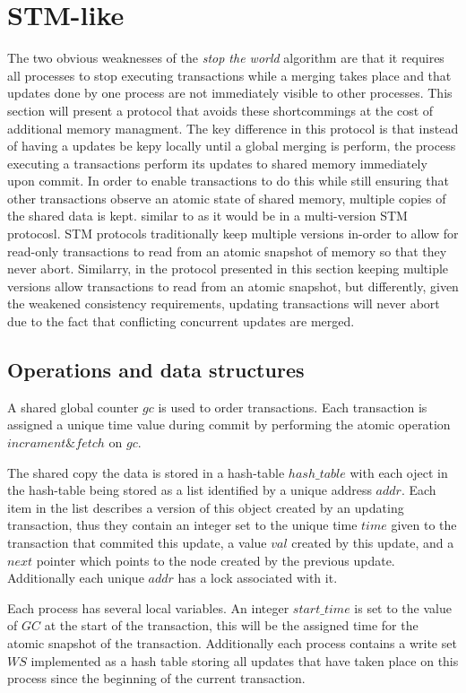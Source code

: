 \documentclass[11pt,letterpaper]{article}
\begin{document}
\section{STM-like}
The two obvious weaknesses of the \emph{stop the world} algorithm are that
it requires all processes to stop executing transactions while a merging takes place
and that updates done by one process are not immediately visible to other processes.
This section will present a protocol that avoids these shortcommings at the cost
of additional memory managment.
The key difference in this protocol is that instead of having a updates be kepy
locally until a global merging is perform, the process executing a transactions
perform its updates to shared memory immediately upon commit.
In order to enable transactions to do this while still ensuring that other transactions
observe an atomic state of shared memory, multiple copies of the shared data is kept.
similar to as it would be in a multi-version STM protocosl.
STM protocols traditionally keep multiple versions in-order to allow for read-only transactions
to read from an atomic snapshot of memory so that they never abort.
Similarry, in the protocol presented in this section keeping multiple versions allow transactions to read
from an atomic snapshot, but differently, given the weakened consistency requirements, updating transactions
will never abort due to the fact that conflicting concurrent updates are merged.

\subsection{Operations and data structures}
A shared global counter $\mathit{gc}$ is used to order transactions.
Each transaction is assigned a unique time value during commit by performing the atomic
operation $\mathit{incrament\&fetch}$ on $\mathit{gc}$.


The shared copy the data is stored in a hash-table
$\mathit{hash\_table}$ with each oject in the hash-table
being stored as a list identified by a unique address $\mathit{addr}$.
Each item in the list describes a version of this object created
by an updating transaction, thus they contain an integer
set to the unique time $\mathit{time}$ given to the transaction that commited this
update, a value $\mathit{val}$ created by this update, and a $\mathit{next}$ pointer
which points to the node created by the previous update.
Additionally each unique $\mathit{addr}$ has a lock associated with it.


Each process has several local variables.
An integer $\mathit{start\_time}$ is set to the value of $\mathit{GC}$
at the start of the transaction,
this will be the assigned time for the atomic snapshot of the transaction.
Additionally each process contains a write set $\mathit{WS}$
implemented as a hash table
storing all updates that have taken place on this process
since the beginning of the current transaction.
\end{document}
